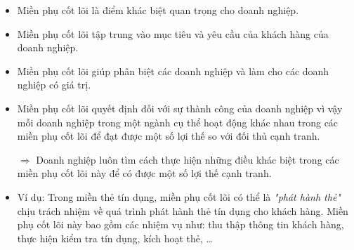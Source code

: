 \begin{itemize}

\item Miền phụ cốt lõi là điểm khác biệt quan trọng cho doanh nghiệp.

\item Miền phụ cốt lõi tập trung vào mục tiêu và yêu cầu của khách hàng của doanh nghiệp.

\item Miền phụ cốt lõi giúp phân biệt các doanh nghiệp và làm cho các doanh nghiệp có giá trị.

\item Miền phụ cốt lõi quyết định đối với sự thành công của doanh nghiệp vì vậy mỗi doanh nghiệp trong một ngành cụ thể hoạt động khác nhau trong các miền phụ cốt lõi để đạt được một số lợi thế so với đối thủ cạnh tranh.

$\Rightarrow$ Doanh nghiệp luôn tìm cách thực hiện những điều khác biệt trong các miền phụ cốt lõi này để có được một số lợi thế cạnh tranh.

\item Ví dụ: Trong miền thẻ tín dụng, miền phụ cốt lõi có thể là \textit{"phát hành thẻ"} chịu trách nhiệm về quá trình phát hành thẻ tín dụng cho khách hàng. Miền phụ cốt lõi này bao gồm các nhiệm vụ như: thu thập thông tin khách hàng, thực hiện kiểm tra tín dụng, kích hoạt thẻ, \dots

\end{itemize}

